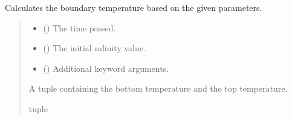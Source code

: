 \documentclass[a4paper,11pt,english,openany]{sphinxmanual}
\begin{document}
\begin{fulllineitems}
\label{\detokenize{api/spyice.preprocess.initial_boundary_conditions:src.spyice.preprocess.initial_boundary_conditions.calculate_boundary_temperature}}
\pysigstartsignatures
\pysiglinewithargsret
{}
{\sphinxparamcomma {}\sphinxparamcomma {}}
{}
\pysigstopsignatures
\sphinxAtStartPar
Calculates the boundary temperature based on the given parameters.
\begin{quote}\begin{description}
\begin{itemize}
\item {} 
\sphinxAtStartPar
{} () \textendash{} The time passed.

\item {} 
\sphinxAtStartPar
{} () \textendash{} The initial salinity value.

\item {} 
\sphinxAtStartPar
{} () \textendash{} Additional keyword arguments.

\end{itemize}

\sphinxAtStartPar
A tuple containing the bottom temperature and the top temperature.

\sphinxAtStartPar
tuple

\end{description}\end{quote}

\end{fulllineitems}

\end{document}
